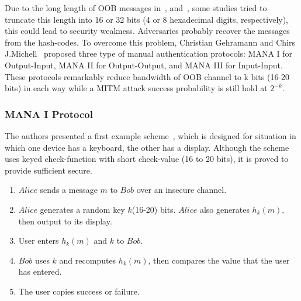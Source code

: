Due to the long length of OOB messages in~\cite{1624021}, and~\cite{Smetters02talkingto}, some studies tried to truncate this length into 16 or 32 bits (4 or 8 hexadecimal digits, respectively), this could lead to security weakness. Adversaries probably recover the messages from the hash-codes. To overcome this problem, Christian Gehramann and Chirs J.Michell~\cite{Mitchell:2004p25948} proposed three type of manual authentication protocols: MANA I for Output-Input, MANA II for Output-Output, and MANA III for Input-Input. These protocols remarkably reduce bandwidth of OOB channel to k bits (16-20 bits) in each way while a MITM attack success probability is still hold at $2^{-k}$. 

\subsubsection*{MANA I Protocol}

The authors presented a first example scheme~\cite{Mitchell:2004p25948}, which is designed for situation in which one device has a keyboard, the other has a display. Although the scheme uses keyed check-function with short check-value (16 to 20 bits), it is proved to provide sufficient secure. 

\begin{enumerate}
\item $Alice$ sends a message $m$ to $Bob$ over an insecure channel. 
\item $Alice$ generates a random key $k$(16-20) bits. $Alice$ also generates $h_k(m)$, then output to its display.
\item User enters $h_k(m)$ and $k$ to $Bob$.
\item $Bob$ uses $k$ and recomputes $h_k(m)$, then compares the value that the user has entered.
\item The user copies success or failure. 
\end{enumerate}

\begin{center}
\end{center}

